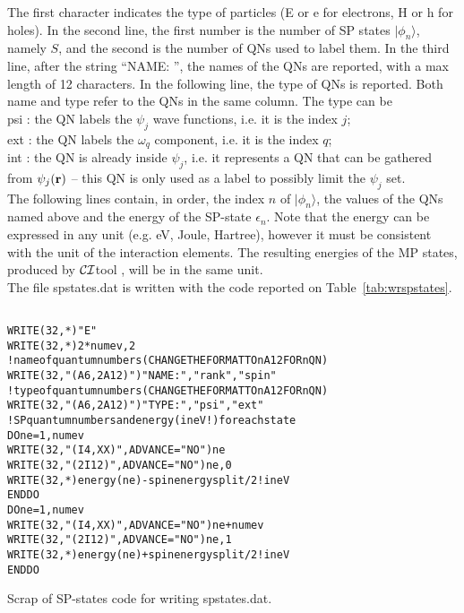\documentclass[12pt,twoside]{article}
\newcommand*{\CItool}[0]{{$\cal CI$}\textsf{tool} }
\begin{document}
The first character indicates the type of particles (\textsf{E} or
\textsf{e} for electrons, \textsf{H} or \textsf{h} for holes).  In the
second line, the first number is the number of SP states
$|\phi_n\rangle$, namely $S$, and the second is the number of QNs used
to label them. In the third line, after the string 
``\textsf{NAME: }'', the names of the QNs are reported, with a max length of 12
characters.  In the following line, the type of QNs is reported.  Both
name and type refer to the QNs in the same column.  The type can be \\
\textsf{psi} : the QN labels the $\psi_j$ wave functions, i.e. it is the index $j$; \\
\textsf{ext} : the QN labels the $\omega_q$ component, i.e. it is the index $q$; \\
\textsf{int} : the QN is already inside $\psi_j$, i.e. it represents a QN that can be
gathered from $\psi_j({\bf r})$ -- this QN is only used as a label to
possibly limit the $\psi_j$ set. \\ The following lines contain, in
order, the index $n$ of $|\phi_n\rangle$, the values of the QNs named
above and the energy of the SP-state $\epsilon_n$.  Note that the
energy can be expressed in any unit (e.g. eV, Joule, Hartree), however
it must be consistent with the unit of the interaction elements. The
resulting energies of the MP states, produced by \CItool, will be in
the same unit.
\\
The file \textsf{spstates.dat} is written with the code reported on Table~\ref{tab:wrspstates}.

\begin{table}
\begin{alltt}
\ \\
WRITE(32,*) "E"
WRITE(32,*) 2*numev, 2
! name of quantum numbers (CHANGE THE FORMAT TO nA12 FOR n QN)
WRITE(32,"(A6,2A12)") "NAME: ", "rank", "spin"
! type of quantum numbers (CHANGE THE FORMAT TO nA12 FOR n QN)
WRITE(32,"(A6,2A12)") "TYPE: ", "psi",  "ext"
! SP quantum numbers and energy (in eV !) for each state
DO ne= 1, numev
  WRITE(32,"(I4,XX)",ADVANCE="NO") ne
  WRITE(32,"(2I12)",ADVANCE="NO") ne, 0
  WRITE(32,*) energy(ne) - spinenergysplit/2  ! in eV
END DO
DO ne= 1, numev
  WRITE(32,"(I4,XX)",ADVANCE="NO") ne+numev
  WRITE(32,"(2I12)",ADVANCE="NO") ne, 1
  WRITE(32,*) energy(ne) + spinenergysplit/2  ! in eV
END DO
\end{alltt}
\caption{Scrap of SP-states code for writing \textsf{spstates.dat}.}
\label{tab:wrspstates}
\end{table}
\end{document}
